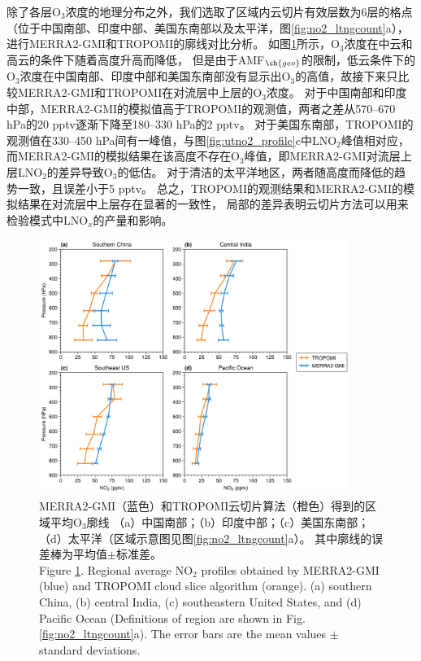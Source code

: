 除了各层O$_3$浓度的地理分布之外，我们选取了区域内云切片有效层数为6层的格点（位于中国南部、印度中部、美国东南部以及太平洋，图\ref{fig:no2_ltngcount}a），
进行MERRA2-GMI和TROPOMI的廓线对比分析。
如图\ref{fig:uto3_profile}所示，O$_3$浓度在中云和高云的条件下随着高度升高而降低，
但是由于AMF$_{\ch{geo}}$的限制，低云条件下的O$_3$浓度在中国南部、印度中部和美国东南部没有显示出O$_3$的高值，故接下来只比较MERRA2-GMI和TROPOMI在对流层中上层的O$_3$浓度。
对于中国南部和印度中部，MERRA2-GMI的模拟值高于TROPOMI的观测值，两者之差从570--670 hPa的20 pptv逐渐下降至180--330 hPa的2 pptv。
对于美国东南部，TROPOMI的观测值在330--450 hPa间有一峰值，与图\ref{fig:utno2_profile}c中LNO$_2$峰值相对应，
而MERRA2-GMI的模拟结果在该高度不存在O$_3$峰值，即MERRA2-GMI对流层上层LNO$_2$的差异导致O$_3$的低估。
对于清洁的太平洋地区，两者随高度而降低的趋势一致，且误差小于5 pptv。
总之，TROPOMI的观测结果和MERRA2-GMI的模拟结果在对流层中上层存在显著的一致性，
局部的差异表明云切片方法可以用来检验模式中LNO$_x$的产量和影响。


\begin{figure}[H]
    \centering
    \includegraphics[width=0.9\textwidth]{./figures/uto3_profile.png}
    \caption{
    MERRA2-GMI（蓝色）和TROPOMI云切片算法（橙色）得到的区域平均O$_3$廓线
    （a）中国南部；（b）印度中部；（c）美国东南部；（d）太平洋（区域示意图见图\ref{fig:no2_ltngcount}a）。
    其中廓线的误差棒为平均值$\pm$标准差。\\
    Figure \ref{fig:uto3_profile}. Regional average NO$_2$ profiles obtained by MERRA2-GMI (blue) and TROPOMI cloud slice algorithm (orange).
    (a) southern China, (b) central India, (c) southeastern United States, and (d) Pacific Ocean
    (Definitions of region are shown in Fig. \ref{fig:no2_ltngcount}a).
    The error bars are the mean values $\pm$ standard deviations.
    }
    \label{fig:uto3_profile}
\end{figure}

